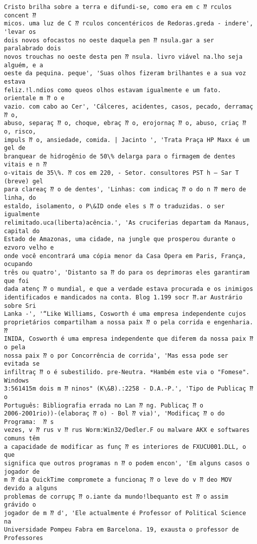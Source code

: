 \documentclass[10pt]{article}
\begin{document}
\begin{Verbatim}[commandchars=\\\{\}]
Cristo brilha sobre a terra e difundi-se, como era em c ⁇ rculos concent ⁇
micos. uma luz de C ⁇ rculos concentéricos de Redoras.greda - indere', 'levar os
dois novos ofocastos no oeste daquela pen ⁇ nsula.gar a ser paralabrado dois
novos trouchas no oeste desta pen ⁇ nsula. livro viável na.lho seja alguém, e a
oeste da pequina. peque', 'Suas olhos fizeram brilhantes e a sua voz estava
feliz.!l.ndios como queos olhos estavam igualmente e um fato. orientale m ⁇ o e
vazio. com cabo ao Cer', 'Cálceres, acidentes, casos, pecado, derramaç ⁇ o,
abuso, separaç ⁇ o, choque, ebraç ⁇ o, erojornaç ⁇ o, abuso, criaç ⁇ o, risco,
impuls ⁇ o, ansiedade, comida. | Jacinto ', 'Trata Praça HP Maxx é um gel de
branquear de hidrogênio de 50\% delarga para o firmagem de dentes vitais e n ⁇
o-vitais de 35\%. ⁇ cos em 220, - Setor. consultores PST h – Sar T (breve) gel
para clareaç ⁇ o de dentes', 'Linhas: com indicaç ⁇ o do n ⁇ mero de linha, do
estaldo, isolamento, o P\&ID onde eles s ⁇ o traduzidas. o ser igualmente
relimitado.uca(liberta)acência.', 'As cruciferias departam da Manaus, capital do
Estado de Amazonas, uma cidade, na jungle que prosperou durante o ezvoro velho e
onde você encontrará uma cópia menor da Casa Opera em Paris, França, ocupando
três ou quatro', 'Distanto sa ⁇ do para os deprimoras eles garantiram que foi
dada atenç ⁇ o mundial, e que a verdade estava procurada e os inimigos
identificados e mandicados na conta. Blog 1.199 socr ⁇.ar Austrário sobre Sri
Lanka -', '“Like Williams, Cosworth é uma empresa independente cujos
proprietários compartilham a nossa paix ⁇ o pela corrida e engenharia.  ⁇
INIDA, Cosworth é uma empresa independente que diferem da nossa paix ⁇ o pela
nossa paix ⁇ o por Concorrência de corrida', 'Mas essa pode ser evitada se
infiltraç ⁇ o é subestilido. pre-Neutra. *Hambém este via o "Fomese". Windows
3:561415m dois m ⁇ ninos" (K\&B).:2258 - D.A.-P.', 'Tipo de Publicaç ⁇ o
Português: Bibliografia errada no Lan ⁇ ng. Publicaç ⁇ o
2006-2001rio))-(elaboraç ⁇ o) - Bol ⁇ via)', 'Modificaç ⁇ o do Programa:  ⁇ s
vezes, v ⁇ rus v ⁇ rus Worm:Win32/Dedler.F ou malware AKX e softwares comuns têm
a capacidade de modificar as funç ⁇ es interiores de FXUCU001.DLL, o que
significa que outros programas n ⁇ o podem encon', 'Em alguns casos o jogador de
m ⁇ dia QuickTime compromete a funcionaç ⁇ o leve do v ⁇ deo MOV devido a alguns
problemas de corrupç ⁇ o.iante da mundo!lbequanto est ⁇ o assim grávido o
jogador de m ⁇ d', 'Ele actualmente é Professor of Political Science na
Universidade Pompeu Fabra em Barcelona. 19, exausta o professor de Professores

\end{Verbatim}
\end{document}
